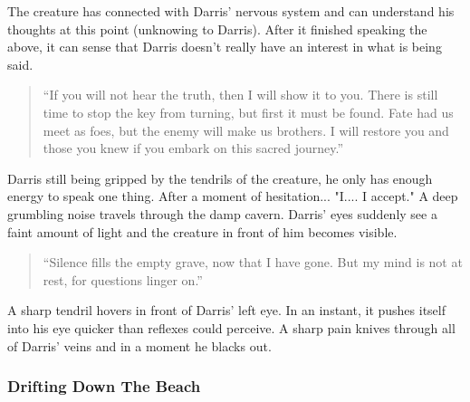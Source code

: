 The creature has connected with Darris' nervous system and can understand his thoughts at this point (unknowing to Darris). After it finished speaking the above, it can sense that Darris doesn't really have an interest in what is being said.

\begin{quote}
	``If you will not hear the truth, then I will show it to you. There is still time to stop the key from turning, but first it must be found. Fate had us meet as foes, but the enemy will make us brothers. I will restore you and those you knew if you embark on this sacred journey.''
\end{quote}

Darris still being gripped by the tendrils of the creature, he only has enough energy to speak one thing. After a moment of hesitation... "I.... I accept." A deep grumbling noise travels through the damp cavern. Darris' eyes suddenly see a faint amount of light and the creature in front of him becomes visible. 

\begin{quote}
	``Silence fills the empty grave, now that I have gone. But my mind is not at rest, for questions linger on.''
\end{quote}

A sharp tendril hovers in front of Darris' left eye. In an instant, it pushes itself into his eye quicker than reflexes could perceive. A sharp pain knives through all of Darris' veins and in a moment he blacks out.

\subsubsection{Drifting Down The Beach}

